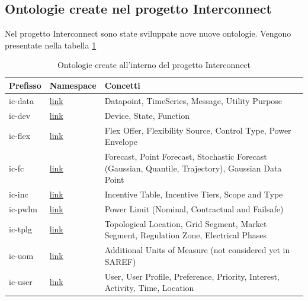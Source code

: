 \subsection{Ontologie create nel progetto Interconnect}
Nel progetto Interconnect sono state sviluppate nove nuove ontologie. Vengono presentate nella tabella \ref{tab:ontologieCreate}
\begin{table}[H]
    \centering
    \begin{tabularx}{\textwidth}{|X|X|X|}
        \hline
        Prefisso & Namespace                                                         & Concetti                                                                                            \\
        \hline
        ic-data  & \href{http://ontology.tno.nl/interconnect/datapoint\#}{link}      & Datapoint, TimeSeries, Message, Utility Purpose                                                     \\
        ic-dev   & \href{http://ontology.tno.nl/interconnect/device\#}{link}         & Device, State, Function                                                                             \\
        ic-flex  & \href{http://ontology.tno.nl/interconnect/flexibility\#}{link}    & Flex Offer, Flexibility Source, Control Type, Power Envelope                                        \\
        ic-fc    & \href{http://ontology.tno.nl/interconnect/forecast\#}{link}       & Forecast, Point Forecast, Stochastic Forecast (Gaussian, Quantile, Trajectory), Gaussian Data Point \\
        ic-inc   & \href{http://ontology.tno.nl/interconnect/incentivetable\#}{link} & Incentive Table, Incentive Tiers, Scope and Type                                                    \\
        ic-pwlm  & \href{http://ontology.tno.nl/interconnect/powerlimit\#}{link}     & Power Limit (Nominal, Contractual and Failsafe)                                                     \\
        ic-tplg  & \href{http://ontology.tno.nl/interconnect/topology\#}{link}       & Topological Location, Grid Segment, Market Segment, Regulation Zone, Electrical Phases              \\
        ic-uom   & \href{http://ontology.tno.nl/interconnect/units\#}{link}          & Additional Units of Measure (not considered yet in SAREF)                                           \\
        ic-user  & \href{http://ontology.tno.nl/interconnect/user\#}{link}           & User, User Profile, Preference, Priority, Interest, Activity, Time, Location                        \\
        \hline
    \end{tabularx}
    \caption{Ontologie create all'interno del progetto Interconnect}
    \label{tab:ontologieCreate}
\end{table}

